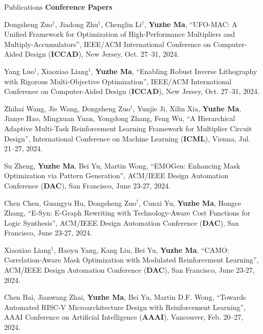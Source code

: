 \begin{rSection}{Publications}
\textbf{Conference Papers}
\begin{etaremune}
	\renewcommand{\labelenumi}{[C\theenumi]}

\item {
    Dongsheng Zuo$^\dagger$, Jiadong Zhu$^\dagger$, Chenglin Li$^\dagger$, \textbf{Yuzhe Ma},
    ``UFO-MAC: A Unified Framework for Optimization of High-Performance Multipliers and Multiply-Accumulators'',
    IEEE/ACM International Conference on Computer-Aided Design (\textbf{ICCAD}), New Jersey, Oct. 27–31, 2024.
}

\item {
    Yang Luo$^\dagger$, Xiaoxiao Liang$^\dagger$, \textbf{Yuzhe Ma},
    ``Enabling Robust Inverse Lithography with Rigorous Multi-Objective Optimization'',
    IEEE/ACM International Conference on Computer-Aided Design (\textbf{ICCAD}), New Jersey, Oct. 27–31, 2024.
}

\item {
    Zhihai Wang, Jie Wang, Dongsheng Zuo$^\dagger$, Yunjie Ji, Xilin Xia, \textbf{Yuzhe Ma}, Jianye Hao, Mingxuan Yuan, Yongdong Zhang, Feng Wu,
    ``A Hierarchical Adaptive Multi-Task Reinforcement Learning Framework for Multiplier Circuit Design'',
    International Conference on Machine Learning (\textbf{ICML}), Vienna, Jul. 21–27, 2024.
}

\item {
    Su Zheng, \textbf{Yuzhe Ma}, Bei Yu, Martin Wong,
    ``EMOGen: Enhancing Mask Optimization via Pattern Generation'',
    ACM/IEEE Design Automation Conference (\textbf{DAC}), San Francisco, June 23-27, 2024.
}

\item {
    Chen Chen, Guangyu Hu, Dongsheng Zuo$^\dagger$, Cunxi Yu, \textbf{Yuzhe Ma}, Hongce Zhang,
    ``E-Syn: E-Graph Rewriting with Technology-Aware Cost Functions for Logic Synthesis'',
    ACM/IEEE Design Automation Conference (\textbf{DAC}), San Francisco, June 23-27, 2024.
}

\item {
    Xiaoxiao Liang$^\dagger$, Haoyu Yang, Kang Liu, Bei Yu, \textbf{Yuzhe Ma},
    ``CAMO: Correlation-Aware Mask Optimization with Modulated Reinforcement Learning'',
    ACM/IEEE Design Automation Conference (\textbf{DAC}), San Francisco, June 23-27, 2024.
}

\item {
    Chen Bai, Jianwang Zhai, \textbf{Yuzhe Ma}, Bei Yu, Martin D.F. Wong,
    ``Towards Automated RISC-V Microarchitecture Design with Reinforcement Learning'',
    AAAI Conference on Artificial Intelligence (\textbf{AAAI}), Vancouver, Feb. 20–27, 2024.
}


\end{etaremune}
\end{rSection}
